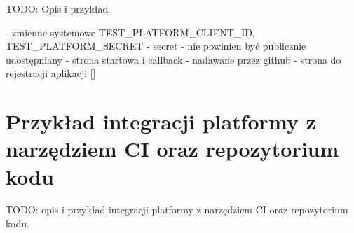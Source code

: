 TODO: Opis i przykład

- zmienne systemowe TEST\_PLATFORM\_CLIENT\_ID, TEST\_PLATFORM\_SECRET
- secret - nie powinien być publicznie udostępniany
- strona startowa i callback
- nadawane przez github
- strona do rejestracji aplikacji []

\section {Przykład integracji platformy z narzędziem CI oraz repozytorium kodu}
\label{ci-integration}

TODO: opis i przykład integracji platformy z narzędziem CI oraz repozytorium
kodu.